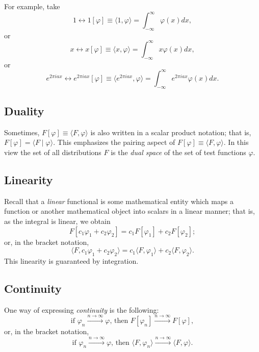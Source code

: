 {
\color{blue}
\bexample
For example, take
$$1 \longleftrightarrow 1 [\varphi ]\equiv \langle 1 , \varphi \rangle
=\int_{-\infty}^\infty
\varphi (x)
dx  , $$
or
$$x \longleftrightarrow x [\varphi ]\equiv \langle x , \varphi \rangle =\int_{-\infty}^\infty
x\varphi (x)
dx,$$
or
$$e^{2\pi i ax} \longleftrightarrow e^{2\pi i ax} [\varphi ]\equiv \langle e^{2\pi i ax}  ,
\varphi \rangle
=\int_{-\infty}^\infty
e^{2\pi i ax} \varphi (x)
dx  .$$
\eexample
}

\subsection{Duality}

Sometimes, $F[\varphi ]\equiv \langle F , \varphi \rangle $   is also written in a scalar product notation; that is,
$F[\varphi] =\langle F \mid \varphi \rangle$.
This emphasizes the pairing aspect of $F[\varphi ]\equiv \langle F , \varphi \rangle $.
In this view the set of all distributions $F$ is the {\em dual space} of the set of test functions $\varphi$.


\subsection{Linearity}


Recall that a {\em linear} functional is some mathematical entity which maps a function or another mathematical object
into scalars in a linear manner; that is, as the integral is linear, we obtain
\begin{equation}
F[c_1\varphi_1+c_2\varphi_2 ]=
c_1F[\varphi_1]  +
c_2F[\varphi_2];
\end{equation}
or, in the bracket notation,
\begin{equation}
\langle F ,   c_1\varphi_1+c_2\varphi_2 \rangle  =
c_1 \langle F ,  \varphi_1   \rangle  +
c_2 \langle F ,   \varphi_2   \rangle .
\end{equation}
This linearity is guaranteed by integration.

\subsection{Continuity}

One way of expressing {\em continuity} is
 the following:
\begin{equation}
\textrm{if }
\varphi_n \stackrel{n\rightarrow \infty}{\longrightarrow} \varphi
\textrm{, then }
F[\varphi_n ] \stackrel{n\rightarrow \infty}{\longrightarrow} F[\varphi  ],
\end{equation}
or, in the bracket notation,
\begin{equation}
\textrm{if }
\varphi_n \stackrel{n\rightarrow \infty}{\longrightarrow} \varphi
\textrm{, then }
\langle F ,    \varphi_n  \rangle \stackrel{n\rightarrow \infty}{\longrightarrow} \langle F ,    \varphi   \rangle .
\end{equation}


